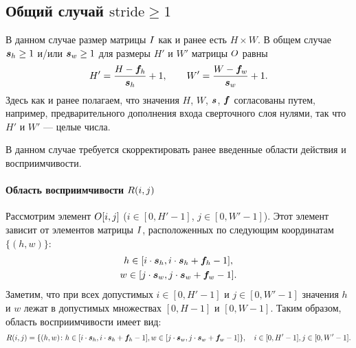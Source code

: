 \documentclass{report}
\numberwithin{theorem}{chapter}
\numberwithin{statement}{chapter}
\numberwithin{lemma}{chapter}
\theoremstyle{definition}
\numberwithin{task}{chapter}
\theoremstyle{remark}
\numberwithin{example}{chapter}
\theoremstyle{definition}
\numberwithin{definition}{chapter}
\theoremstyle{remark}
\theoremstyle{remark}
\numberwithin{lyrics}{section}
\begin{document}
\subsection{Общий случай $\text{stride} \ge 1$}
В данном случае размер матрицы $I$ как и ранее есть $H \times W$. В общем случае $\boldsymbol{s}_h \ge 1$ и/или $\boldsymbol{s}_w \ge 1$ для размеры $H' $ и $W'$ матрицы $O$ равны
\begin{equation}
H' = \frac{H - \boldsymbol{f}_h}{\boldsymbol{s}_h} + 1, \qquad W' = \frac{W - \boldsymbol{f}_w}{\boldsymbol{s}_w} + 1.
\end{equation}
Здесь как и ранее полагаем, что значения $H$, $W$, $\boldsymbol{s}$, $\boldsymbol{f}$ согласованы путем, например, предварительного дополнения входа сверточного слоя нулями, так что $H'$  и $W'$ --- целые числа.

В данном случае требуется скорректировать ранее введенные области действия и восприимчивости.

\paragraph{Область восприимчивости $R(i, j)$}
Рассмотрим элемент $O[i, j]$ ($i \in [0, H'- 1]$, $j \in [0, W' - 1]$). Этот элемент зависит от элементов матрицы $I$, расположенных по следующим координатам $\{(h, w)\}$:
\begin{gather*}
h \in [i \cdot \boldsymbol{s}_h, i \cdot \boldsymbol{s}_h + \boldsymbol{f}_h - 1], \\
w \in [j \cdot \boldsymbol{s}_w, j \cdot \boldsymbol{s}_w + \boldsymbol{f}_w - 1].
\end{gather*}
Заметим, что при всех допустимых $i \in [0, H'- 1]$ и $j \in [0, W' - 1]$ значения $h$ и $w$ лежат в допустимых множествах $[0, H - 1]$ и $[0, W - 1]$. Таким образом, область восприимчивости имеет вид:
\begin{equation}
R(i, j) = \{(h, w)\colon h \in [i \cdot \boldsymbol{s}_h, i \cdot \boldsymbol{s}_h + \boldsymbol{f}_h - 1], w \in [j \cdot \boldsymbol{s}_w, j \cdot \boldsymbol{s}_w + \boldsymbol{f}_w - 1]\}, \quad i \in [0, H'- 1], j \in [0, W' - 1].
\end{equation}
\end{document}
